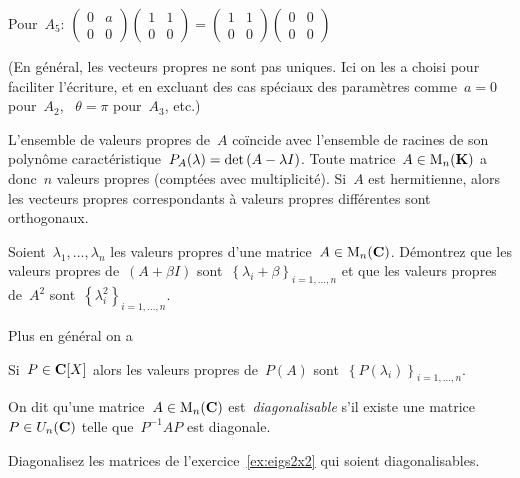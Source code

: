 {	Pour~$A_5$: \(
		\begin{pmatrix} 0 & a \\ 0 & 0 \end{pmatrix}
		\begin{pmatrix} 1 & 1 \\ 0 & 0 \end{pmatrix}
		=
		\begin{pmatrix} 1 & 1 \\ 0 & 0 \end{pmatrix}
		\begin{pmatrix} 0 & 0 \\ 0 & 0 \end{pmatrix}
	\)

	(En général, les vecteurs propres ne sont pas uniques.  Ici on les a choisi
	pour faciliter l'écriture, et en excluant des cas spéciaux des
	paramètres comme~$a=0$ pour~$A_2$, ~$\theta=\pi$ pour~$A_3$, etc.)
}

\begin{proposition}
	\label{prp:eigenalgebra}
	L'ensemble de valeurs propres de~$A$ coïncide avec l'ensemble de racines de
	son polynôme caractéristique~$P_A(\lambda)=\mathrm{det}\left(A-\lambda
	I\right)$.  Toute matrice~$A\in\mathrm{M}_n(\mathbf{K})$ a donc~$n$ valeurs propres (comptées
	avec multiplicité).  Si~$A$ est hermitienne, alors les vecteurs propres
	correspondants à valeurs propres différentes sont orthogonaux.
\end{proposition}

\begin{exercice}
	Soient~$\lambda_1,\ldots,\lambda_n$ les valeurs propres d'une
	matrice~$A\in\mathrm{M}_n(\mathbf{C})$.  Démontrez que les valeurs propres de~$(A+\beta I)$
	sont~$\left\{\lambda_i+\beta\right\}_{i=1,\ldots,n}$ et que les valeurs
	propres de~$A^2$ sont~$\left\{\lambda_i^2\right\}_{i=1,\ldots,n}$.
\end{exercice}

Plus en général on a
\begin{proposition}
	Si~$P\in\mathbf{C}[X]$ alors les valeurs propres de~$P(A)$
	sont~$\left\{P(\lambda_i)\right\}_{i=1,\ldots,n}$.
\end{proposition}

On dit qu'une matrice~$A\in\mathrm{M}_n(\mathbf{C})$ est~\emph{diagonalisable} s'il existe
une matrice~$P\in U_n(\mathbf{C})$ telle que~$P^{-1}AP$ est diagonale.

\begin{exercice}
	Diagonalisez les matrices de l'exercice~\ref{ex:eigs2x2} qui soient
	diagonalisables.
\end{exercice}


